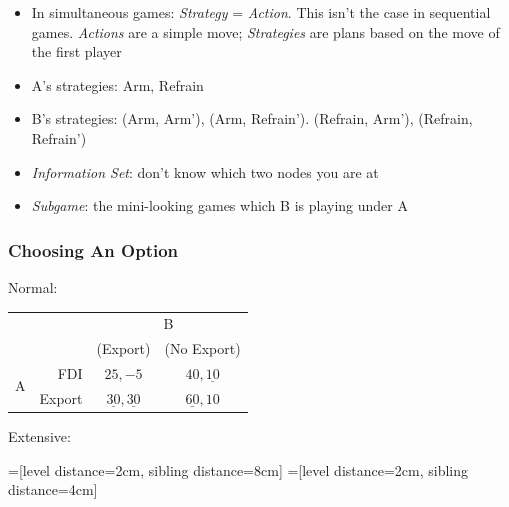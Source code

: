 \documentclass[11pt, english]{article}
\begin{document}
	\begin{itemize}
	\setlength\itemsep{0cm}
		\item In simultaneous games: \textit{Strategy} = \textit{Action}. This isn't the case in sequential games. \textit{Actions} are a simple move; \textit{Strategies} are plans based on the move of the first player
		\item A's strategies: Arm, Refrain
		\item B's strategies: (Arm, Arm'), (Arm, Refrain'). (Refrain, Arm'), (Refrain, Refrain')
		\item \textit{Information Set}: don’t know which two nodes you are at
		\item \textit{Subgame}: the mini-looking games which B is playing under A
	\end{itemize}

		\subsubsection{Choosing An Option}

	Normal:

	\begin{table}[h]
                \renewcommand{\arraystretch}{1,25}
        \begin{center}
        \begin{tabular}{crcc}     
                & & \multicolumn{2}{c}{B}\\
                & & (Export) & (No Export)\\
                \cline{3-4}
		\multirow{2}{*}{A} & FDI & \multicolumn{1}{|c|}{$25,-5$} & \multicolumn{1}{c|}{$40,\underline{10}$}\\
                \cline{3-4}
		& Export & \multicolumn{1}{|c|}{$\underline{30},\underline{30}$} & \multicolumn{1}{c|}{$\underline{60},10$}\\
                \cline{3-4}
        \end{tabular}
        \end{center}
        \end{table}

	Extensive:

	=[level distance=2cm, sibling distance=8cm]
        =[level distance=2cm, sibling distance=4cm]
\end{document}
